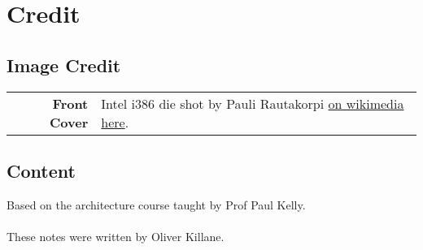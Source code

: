 \chapter{Credit}
\section*{Image Credit}
\begin{center}
	\begin{tabular}{r p{}}
		\textbf{Front Cover} & Intel i386 die shot by Pauli Rautakorpi \href{https://commons.wikimedia.org/wiki/File:Intel_80386_DX_die.JPG}{on wikimedia here}. \\
	\end{tabular}
\end{center}

\section*{Content}
Based on the architecture course taught by Prof Paul Kelly.
\\
\\ These notes were written by Oliver Killane.